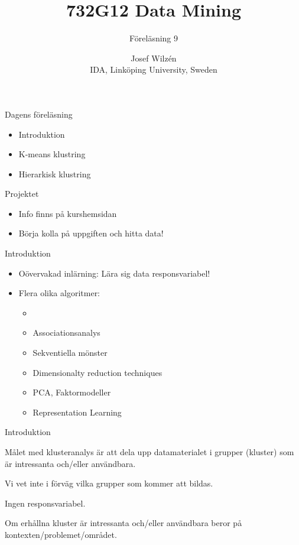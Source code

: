 \documentclass[10pt,english]{beamer}
\title{732G12 Data Mining}
\subtitle{Föreläsning 9}
\date{}
\author{Josef Wilzén \\ IDA, Linköping University, Sweden}
\begin{document}
\maketitle

\begin{frame}{Dagens föreläsning}

    \begin{itemize}
        \item Introduktion
        \item K-means klustring
        \item Hierarkisk klustring
    \end{itemize}
    
\end{frame}

\begin{frame}{Projektet}
    \begin{itemize}
        \item Info finns på kurshemsidan
        \item Börja kolla på uppgiften och hitta data!
    \end{itemize}
\end{frame}

\begin{frame}{Introduktion}
    \begin{itemize}
        \item Oövervakad inlärning: Lära sig data  responsvariabel!
        \item Flera olika algoritmer:
        \begin{itemize}
            \item {}
            \item Associationsanalys
            \item Sekventiella mönster
            \item Dimensionalty reduction techniques
            \item PCA, Faktormodeller
            \item Representation Learning
        \end{itemize}
    \end{itemize}
\end{frame}

\begin{frame}{Introduktion}
    \begin{greenbox}
        Målet med klusteranalys är att dela upp datamaterialet i grupper (kluster) som är intressanta och/eller användbara.
    \end{greenbox}

    Vi vet inte i förväg vilka grupper som kommer att bildas.

    Ingen responsvariabel.
    
    Om erhållna kluster är intressanta och/eller användbara beror på kontexten/problemet/området.
    
    
\end{frame}
\end{document}
